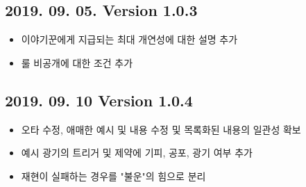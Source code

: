 \documentclass[12pt]{report}
\begin{document}
		\subsection*{2019. 09. 05. Version 1.0.3}
		\begin{itemize}
			\item 이야기꾼에게 지급되는 최대 개연성에 대한 설명 추가
			\item 룰 비공개에 대한 조건 추가
		\end{itemize}
		
		\subsection*{2019. 09. 10 Version 1.0.4}
		\begin{itemize}
			\item 오타 수정, 애매한 예시 및 내용 수정 및 목록화된 내용의 일관성 확보
			\item 예시 광기의 트리거 및 제약에 기피, 공포, 광기 여부 추가
			\item 재현이 실패하는 경우를 "불운"의 힘으로 분리
		\end{itemize}
		
	
\end{document}
